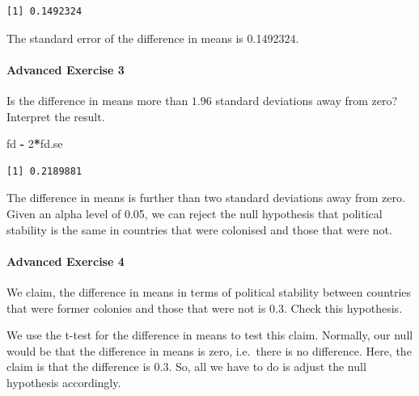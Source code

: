 \documentclass[]{article}
\newenvironment{Shaded}{\begin{snugshade}}{\end{snugshade}}
\newcommand{\KeywordTok}[1]{\textcolor[rgb]{0.13,0.29,0.53}{\textbf{#1}}}
\newcommand{\DataTypeTok}[1]{\textcolor[rgb]{0.13,0.29,0.53}{#1}}
\newcommand{\DecValTok}[1]{\textcolor[rgb]{0.00,0.00,0.81}{#1}}
\newcommand{\FloatTok}[1]{\textcolor[rgb]{0.00,0.00,0.81}{#1}}
\newcommand{\StringTok}[1]{\textcolor[rgb]{0.31,0.60,0.02}{#1}}
\newcommand{\OperatorTok}[1]{\textcolor[rgb]{0.81,0.36,0.00}{\textbf{#1}}}
\newcommand{\NormalTok}[1]{#1}
\let\oldparagraph\paragraph
\renewcommand{\paragraph}[1]{\oldparagraph{#1}\mbox{}}
\theoremstyle{definition}
\theoremstyle{definition}
\theoremstyle{definition}
\theoremstyle{remark}
\begin{document}
\begin{verbatim}
[1] 0.1492324
\end{verbatim}

The standard error of the difference in means is 0.1492324.

\paragraph{Advanced Exercise 3}\label{advanced-exercise-3}

Is the difference in means more than \(1.96\) standard deviations away
from zero? Interpret the result.

\begin{Shaded}
\begin{Highlighting}[]
\NormalTok{fd }\OperatorTok{-}\StringTok{ }\DecValTok{2}\OperatorTok{*}\NormalTok{fd.se}
\end{Highlighting}
\end{Shaded}

\begin{verbatim}
[1] 0.2189881
\end{verbatim}

The difference in means is further than two standard deviations away
from zero. Given an alpha level of 0.05, we can reject the null
hypothesis that political stability is the same in countries that were
colonised and those that were not.

\paragraph{Advanced Exercise 4}\label{advanced-exercise-4}

We claim, the difference in means in terms of political stability
between countries that were former colonies and those that were not is
0.3. Check this hypothesis.

We use the t-test for the difference in means to test this claim.
Normally, our null would be that the difference in means is zero,
i.e.~there is no difference. Here, the claim is that the difference is
0.3. So, all we have to do is adjust the null hypothesis accordingly.

\begin{Shaded}
\end{Shaded}
\end{document}
